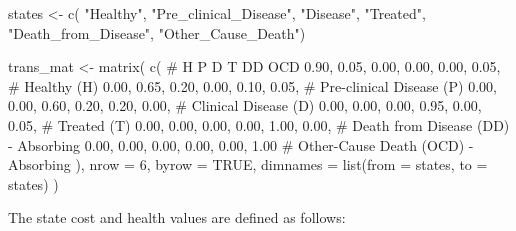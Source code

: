 \documentclass[
]{article}
\newenvironment{Shaded}{\begin{snugshade}}{\end{snugshade}}
\newcommand{\AttributeTok}[1]{\textcolor[rgb]{0.40,0.45,0.13}{#1}}
\newcommand{\CommentTok}[1]{\textcolor[rgb]{0.37,0.37,0.37}{#1}}
\newcommand{\ConstantTok}[1]{\textcolor[rgb]{0.56,0.35,0.01}{#1}}
\newcommand{\DecValTok}[1]{\textcolor[rgb]{0.68,0.00,0.00}{#1}}
\newcommand{\FloatTok}[1]{\textcolor[rgb]{0.68,0.00,0.00}{#1}}
\newcommand{\FunctionTok}[1]{\textcolor[rgb]{0.28,0.35,0.67}{#1}}
\newcommand{\NormalTok}[1]{\textcolor[rgb]{0.00,0.23,0.31}{#1}}
\newcommand{\OtherTok}[1]{\textcolor[rgb]{0.00,0.23,0.31}{#1}}
\newcommand{\StringTok}[1]{\textcolor[rgb]{0.13,0.47,0.30}{#1}}
\begin{document}
\begin{Shaded}
\begin{Highlighting}[]
\NormalTok{states }\OtherTok{\textless{}{-}} \FunctionTok{c}\NormalTok{(}
  \StringTok{"Healthy"}\NormalTok{, }\StringTok{"Pre\_clinical\_Disease"}\NormalTok{, }\StringTok{"Disease"}\NormalTok{, }\StringTok{"Treated"}\NormalTok{, }\StringTok{"Death\_from\_Disease"}\NormalTok{, }
  \StringTok{"Other\_Cause\_Death"}\NormalTok{)}

\NormalTok{trans\_mat }\OtherTok{\textless{}{-}} \FunctionTok{matrix}\NormalTok{(}
  \FunctionTok{c}\NormalTok{(}
    \CommentTok{\#    H     P     D     T     DD    OCD}
    \FloatTok{0.90}\NormalTok{, }\FloatTok{0.05}\NormalTok{, }\FloatTok{0.00}\NormalTok{, }\FloatTok{0.00}\NormalTok{, }\FloatTok{0.00}\NormalTok{, }\FloatTok{0.05}\NormalTok{, }\CommentTok{\# Healthy (H)}
    \FloatTok{0.00}\NormalTok{, }\FloatTok{0.65}\NormalTok{, }\FloatTok{0.20}\NormalTok{, }\FloatTok{0.00}\NormalTok{, }\FloatTok{0.10}\NormalTok{, }\FloatTok{0.05}\NormalTok{, }\CommentTok{\# Pre{-}clinical Disease (P)}
    \FloatTok{0.00}\NormalTok{, }\FloatTok{0.00}\NormalTok{, }\FloatTok{0.60}\NormalTok{, }\FloatTok{0.20}\NormalTok{, }\FloatTok{0.20}\NormalTok{, }\FloatTok{0.00}\NormalTok{, }\CommentTok{\# Clinical Disease (D)}
    \FloatTok{0.00}\NormalTok{, }\FloatTok{0.00}\NormalTok{, }\FloatTok{0.00}\NormalTok{, }\FloatTok{0.95}\NormalTok{, }\FloatTok{0.00}\NormalTok{, }\FloatTok{0.05}\NormalTok{, }\CommentTok{\# Treated (T)}
    \FloatTok{0.00}\NormalTok{, }\FloatTok{0.00}\NormalTok{, }\FloatTok{0.00}\NormalTok{, }\FloatTok{0.00}\NormalTok{, }\FloatTok{1.00}\NormalTok{, }\FloatTok{0.00}\NormalTok{, }\CommentTok{\# Death from Disease (DD) {-} Absorbing}
    \FloatTok{0.00}\NormalTok{, }\FloatTok{0.00}\NormalTok{, }\FloatTok{0.00}\NormalTok{, }\FloatTok{0.00}\NormalTok{, }\FloatTok{0.00}\NormalTok{, }\FloatTok{1.00}  \CommentTok{\# Other{-}Cause Death (OCD) {-} Absorbing}
\NormalTok{  ),}
  \AttributeTok{nrow =} \DecValTok{6}\NormalTok{, }\AttributeTok{byrow =} \ConstantTok{TRUE}\NormalTok{,}
  \AttributeTok{dimnames =} \FunctionTok{list}\NormalTok{(}\AttributeTok{from =}\NormalTok{ states, }
                  \AttributeTok{to =}\NormalTok{ states)}
\NormalTok{)}
\end{Highlighting}
\end{Shaded}

The state cost and health values are defined as follows:
\end{document}
